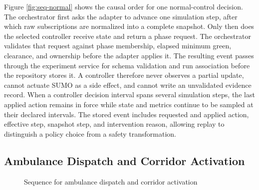 Figure \ref{fig:seq-normal} shows the causal order for one normal-control decision. The orchestrator first asks the adapter to advance one simulation step, after which raw subscriptions are normalized into a complete snapshot. Only then does the selected controller receive state and return a phase request. The orchestrator validates that request against phase membership, elapsed minimum green, clearance, and ownership before the adapter applies it. The resulting event passes through the experiment service for schema validation and run association before the repository stores it. A controller therefore never observes a partial update, cannot actuate SUMO as a side effect, and cannot write an unvalidated evidence record. When a controller decision interval spans several simulation steps, the last applied action remains in force while state and metrics continue to be sampled at their declared intervals. The stored event includes requested and applied action, effective step, snapshot step, and intervention reason, allowing replay to distinguish a policy choice from a safety transformation.

\subsection{Ambulance Dispatch and Corridor Activation}

\begin{figure}[htbp]
\centering
{}
\caption{Sequence for ambulance dispatch and corridor activation}
\label{fig:seq-dispatch}
\end{figure}

